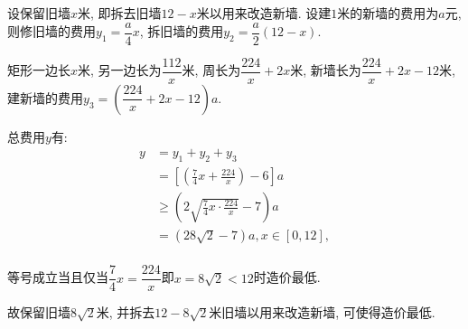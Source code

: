 \documentclass[8pt]{article}
\begin{document}
\begin{enumerate}[label=\arabic*.]
			设保留旧墙$x$米, 即拆去旧墙$12-x$米以用来改造新墙. 设建$1$米的新墙的费用为$a$元, 则修旧墙的费用$y_1 = \dfrac{a}{4} x$, 拆旧墙的费用$y_2 = \dfrac{a}{2} (12-x)$.

			矩形一边长$x$米, 另一边长为$\dfrac{112}{x}$米, 周长为$\dfrac{224}{x}+2x$米, 新墙长为$\dfrac{224}{x}+2x-12$米, 建新墙的费用$y_3=\left(\dfrac{224}{x}+2x-12\right)a$.

			总费用$y$有:
			\begin{align*}
				y &= y_1 + y_2 + y_3\\
				  &= \left[\left(\frac{7}{4} x + \frac{224}{x}\right) - 6\right]a\\
				  &\geq \left(2\sqrt{\frac{7}{4}x \cdot \frac{224}{x}}-7\right)a\\
				  &= (28\sqrt{2} - 7) a, x\in[0, 12],\\
			\end{align*}

			等号成立当且仅当$\dfrac{7}{4} x = \dfrac{224}{x}$即$x=8\sqrt{2}<12$时造价最低.

			故保留旧墙$8\sqrt{2}$米, 并拆去$12-8\sqrt{2}$米旧墙以用来改造新墙, 可使得造价最低.

	\end{enumerate}
\end{document}
